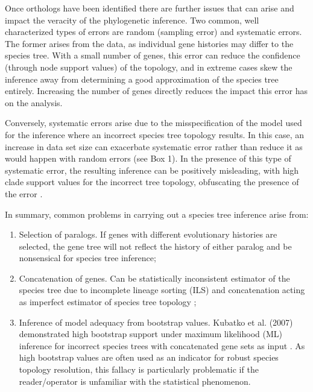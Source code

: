 \documentclass[12pt]{article}
\begin{document}
Once orthologs have been identified there are further issues that can arise and impact the veracity of the phylogenetic inference.
Two common, well characterized types of errors are random (sampling error) and systematic errors. 
The former arises from the data, as individual gene histories may differ to the species tree. 
With a small number of genes, this error can reduce the confidence (through node support values) of the topology, and in extreme cases skew the inference away from determining a good approximation of the species tree entirely. 
Increasing the number of genes directly reduces the impact this error has on the analysis. 

Conversely, systematic errors arise due to the misspecification of the model used for the inference where an incorrect species tree topology results. 
In this case, an increase in data set size can exacerbate systematic error rather than reduce it as would happen with random errors (see Box 1). 
In the presence of this type of systematic error, the resulting inference can be positively misleading,
 with high clade support values for the incorrect tree topology, obfuscating the presence of the error \cite{jeffroy2006phylogenomics,roch2015likelihood,kubatko2007inconsistency}. 

In summary, common problems in carrying out a species tree inference arise from:\\
\begin{enumerate}
\item Selection of paralogs. 
If genes with different evolutionary histories are selected, the gene tree will not reflect the history of either paralog and be nonsensical for species tree inference;
\item Concatenation of genes. 
Can be statistically inconsistent estimator of the species tree due to incomplete lineage sorting (ILS) and concatenation acting as imperfect estimator of species tree topology \cite{roch2015likelihood};
\item Inference of model adequacy from bootstrap values. 
Kubatko et al. (2007) demonstrated high bootstrap support under maximum likelihood (ML) inference for incorrect species trees with concatenated gene sets as input \cite{kubatko2007inconsistency}. 
As high bootstrap values are often used as an indicator for robust species topology resolution, this fallacy is particularly problematic if the reader/operator is unfamiliar with the statistical phenomenon.
\end{enumerate}
\end{document}
